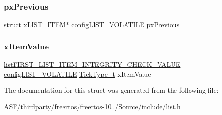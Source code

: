 \mbox{\label{structx_m_i_n_i___l_i_s_t___i_t_e_m_a0294e93ecc18bcdb723038af1027505d}} 
\subsubsection{\texorpdfstring{pxPrevious}{pxPrevious}}
{\footnotesize\ttfamily struct \mbox{\hyperlink{structx_l_i_s_t___i_t_e_m}{x\+L\+I\+S\+T\+\_\+\+I\+T\+EM}}$\ast$ \mbox{\hyperlink{list_8h_a2d5de557c5561c8980d1bf51d87d8cba}{config\+L\+I\+S\+T\+\_\+\+V\+O\+L\+A\+T\+I\+LE}} px\+Previous}

\mbox{\label{structx_m_i_n_i___l_i_s_t___i_t_e_m_aa6f3caf3e73107fb0da6fede4b06f104}} 
\subsubsection{\texorpdfstring{xItemValue}{xItemValue}}
{\footnotesize\ttfamily \mbox{\hyperlink{list_8h_a3611bd5d5d87cb26ac1dc7a4852b94a0}{list\+F\+I\+R\+S\+T\+\_\+\+L\+I\+S\+T\+\_\+\+I\+T\+E\+M\+\_\+\+I\+N\+T\+E\+G\+R\+I\+T\+Y\+\_\+\+C\+H\+E\+C\+K\+\_\+\+V\+A\+L\+UE}} \mbox{\hyperlink{list_8h_a2d5de557c5561c8980d1bf51d87d8cba}{config\+L\+I\+S\+T\+\_\+\+V\+O\+L\+A\+T\+I\+LE}} \mbox{\hyperlink{portmacro_8h_aa69c48c6e902ce54f70886e6573c92a9}{Tick\+Type\+\_\+t}} x\+Item\+Value}



The documentation for this struct was generated from the following file\+:\begin{DoxyCompactItemize}
\item 
A\+S\+F/thirdparty/freertos/freertos-\/10../\+Source/include/\mbox{\hyperlink{list_8h}{list.\+h}}\end{DoxyCompactItemize}
